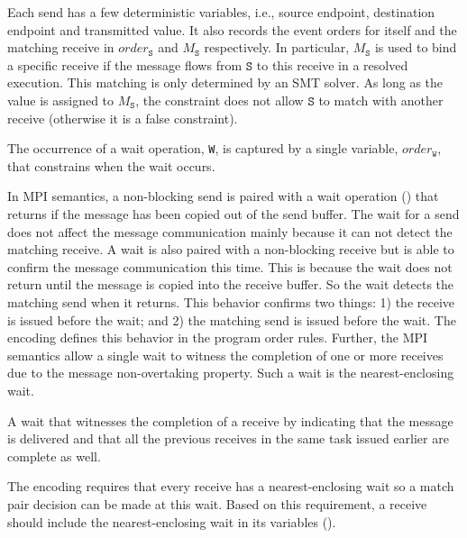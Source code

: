 Each send has a few deterministic variables, i.e., source endpoint, destination endpoint and transmitted value. It also records the event orders for itself and the matching receive in $\mathit{order}_\mathtt{S}$ and $M_\mathtt{S}$ respectively. In particular, $M_\mathtt{S}$ is used to bind a specific receive if the message flows from $\mathtt{S}$ to this receive in a resolved execution. This matching is only determined by an SMT solver. As long as the value is assigned to $M_\mathtt{S}$, the constraint does not allow $\mathtt{S}$ to match with another receive (otherwise it is a false constraint).

\begin{definition}[Wait] \label{def:wait}
The occurrence of a wait operation, \texttt{W}, is captured by a
single variable, $\mathit{order}_\mathtt{W}$, that constrains when
the wait occurs.
\end{definition}

In MPI semantics, a non-blocking send is paired with a wait operation () that returns if the message has been copied out of the send buffer. The wait for a send does not affect the message communication mainly because it can not detect the matching receive. A wait is also paired with a non-blocking receive but is able to confirm the message communication this time. This is because the wait does not return until the message is copied into the receive buffer. So the wait detects the matching send when it returns. This behavior confirms two things: 1) the receive is issued before the wait; and 2) the matching send is issued before the wait. The encoding defines this behavior in the program order rules. Further, the MPI semantics allow a single wait to witness the completion of one or more receives due to the message non-overtaking property. Such a wait is the nearest-enclosing wait.

\begin{definition} \label{def:nw}
A wait that witnesses the completion of a receive by indicating that
the message is delivered and that all the previous receives in the
same task issued earlier are complete as well.
\end{definition}

The encoding requires that every receive has a nearest-enclosing wait so a match pair decision can be made at this wait. Based on this requirement, a receive should include the nearest-enclosing wait in its variables ().

